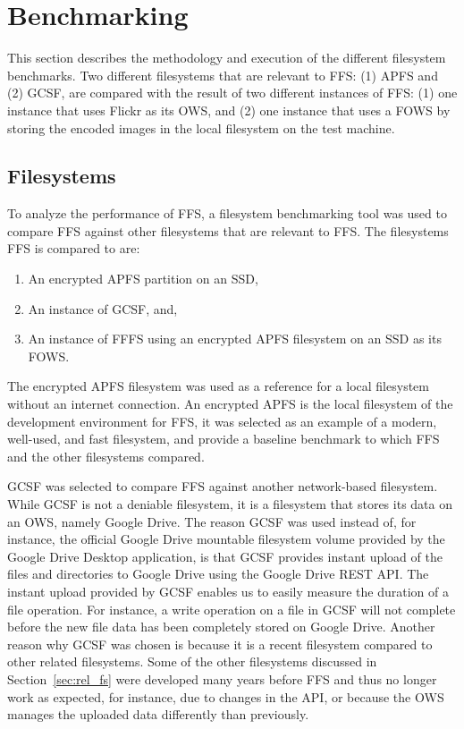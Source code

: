 \section{Benchmarking}
This section describes the methodology and execution of the different filesystem benchmarks. Two different filesystems that are relevant to \gls{FFS}: (1) \gls{APFS} and (2) \gls{GCSF}, are compared with the result of two different instances of \gls{FFS}: (1) one instance that uses Flickr as its \gls{OWS}, and (2) one instance that uses a \gls{FOWS} by storing the encoded images in the local filesystem on the test machine. 

\subsection{Filesystems}
To analyze the performance of \gls{FFS}, a filesystem benchmarking tool was used to compare \gls{FFS} against other filesystems that are relevant to \gls{FFS}. The filesystems \gls{FFS} is compared to are:
\begin{enumerate}
	\item An encrypted \gls{APFS} partition on an SSD,
	\item An instance of \gls{GCSF}, and,
	\item An instance of \gls{FFFS} using an encrypted \gls{APFS} filesystem on an SSD as its \gls{FOWS}.
\end{enumerate}
The encrypted \gls{APFS} filesystem was used as a reference for a local filesystem without an internet connection. An encrypted \gls{APFS} is the local filesystem of the development environment for \gls{FFS}, it was selected as an example of a modern, \mbox{well-used}, and fast filesystem, and provide a baseline benchmark to which \gls{FFS} and the other filesystems compared.

\gls{GCSF} was selected to compare \gls{FFS} against another \mbox{network-based} filesystem. While \gls{GCSF} is not a deniable filesystem, it is a filesystem that stores its data on an \gls{OWS}, namely Google Drive. The reason \gls{GCSF} was used instead of, for instance, the official Google Drive mountable filesystem volume provided by the Google Drive Desktop application, is that \gls{GCSF} provides instant upload of the files and directories to Google Drive using the Google Drive REST \gls{API}. The instant upload provided by \gls{GCSF} enables us to easily measure the duration of a file operation. For instance, a write operation on a file in \gls{GCSF} will not complete before the new file data has been completely stored on Google Drive. Another reason why \gls{GCSF} was chosen is because it is a recent filesystem compared to other related filesystems. Some of the other filesystems discussed in Section~\ref{sec:rel_fs} were developed many years before \gls{FFS} and thus no longer work as expected, for instance, due to changes in the \gls{API}, or because the \gls{OWS} manages the uploaded data differently than previously.

